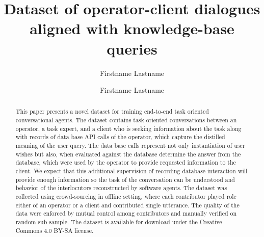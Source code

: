 \documentclass[runningheads,a4paper]{llncs}
\begin{document}


\title{Dataset of operator-client dialogues aligned with knowledge-base queries}


%

\iftrue %
\author{Firstname Lastname \and Firstname Lastname }
\fi
			
\maketitle

\begin{abstract}
    This paper presents a novel dataset for training end-to-end task oriented conversational agents.
    The dataset contains task oriented conversations between an operator, a task expert, and a client who is seeking information about the task along with records of data base API calls of the operator, which capture the distilled meaning of the user query.
    The data base calls represent not only instantiation of user wishes but also, when evaluated against the database determine the answer from the database, which were used by the operator to provide requested information to the client. 
    We expect that this additional supervision of recording database interaction will provide enough information so the task of the conversation can be understood and behavior of the interlocutors reconstructed by software agents.
    The dataset was collected using crowd-sourcing in offline setting, where each contributor played role either of an operator or a client and contributed single utterance.
    The quality of the data were enforced by mutual control among contributors and manually verified on random sub-sample.
    The dataset is available for download under the Creative Commons 4.0 BY-SA license.
\end{abstract}
\end{document}
